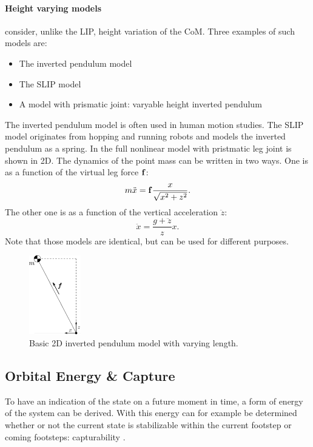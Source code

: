 \paragraph{Height varying models} consider, unlike the \ac{LIP}, height variation of the \ac{CoM}. Three examples of such models are:
\begin{itemize}
	\item The inverted pendulum model \cite{kuo2005energetic}
	\item The \ac{SLIP} model \cite{liu2015trajectory}
	\item A model with prismatic joint: varyable height inverted pendulum \cite{pratt2007derivation}
\end{itemize}
The inverted pendulum model is often used in human motion studies. The \ac{SLIP} model originates from hopping and running robots \cite{schwind1998spring} and models the inverted pendulum as a spring. In  the full nonlinear model with pristmatic leg joint is shown in \ac{2D}. The dynamics of the point mass can be written in two ways. One is as a function of the virtual leg force $\mathbf{f}$:
\begin{equation}
	m\ddot{x} = \mathbf{f}\frac{x}{\sqrt{x^2 + z^2}}.
	\label{eq:dynamicsprattstyle}
\end{equation}
The other one is as a function of the vertical acceleration $\ddot{z}$:
\begin{equation}
	\ddot{x} = \frac{g+\ddot{z}}{z}x.
	\label{eq:dynamicscaronstyle}
\end{equation}
Note that those models are identical, but can be used for different purposes.
\begin{figure}[h]
\centering
\includegraphics[width=0.2\textwidth]{STYLESTUFF/2Dnonlin.png}
\caption{Basic \ac{2D} inverted pendulum model with varying length.}
\label{fig:2Dnonlinmodel}
\end{figure}

\subsection{Orbital Energy \& Capture}\label{sec:ewalking}
To have an indication of the state on a future moment in time, a form of energy of the system can be derived. With this energy can for example be determined whether or not the current state is stabilizable within the current footstep or coming footsteps: capturability \cite{koolen2012capturability}. 

